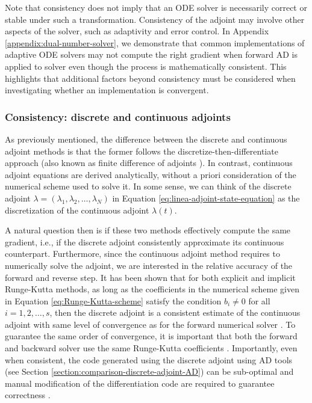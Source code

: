Note that consistency does not imply that an ODE solver is necessarily correct or stable under such a transformation. 
Consistency of the adjoint may involve other aspects of the solver, such as adaptivity and error control. 
In Appendix \ref{appendix:dual-number-solver}, we demonstrate that common implementations of adaptive ODE solvers may not compute the right gradient when forward AD is applied to solver even though the process is mathematically consistent. 
This highlights that additional factors beyond consistency must be considered when investigating whether an implementation is convergent.

\subsubsection{Consistency: discrete and continuous adjoints}

As previously mentioned, the difference between the discrete and continuous adjoint methods is that the former follows the discretize-then-differentiate approach (also known as finite difference of adjoints \cite{Sirkes_Tziperman_1997}).
In contrast, continuous adjoint equations are derived analytically, without a priori consideration of the numerical scheme used to solve it. 
In some sense, we can think of the discrete adjoint $\lambda = (\lambda_1, \lambda_2, \ldots, \lambda_N)$ in Equation \eqref{eq:linea-adjoint-state-equation} as the discretization of the continuous adjoint $\lambda(t)$. 


A natural question then is if these two methods effectively compute the same gradient, i.e., if the discrete adjoint consistently approximate its continuous counterpart. 
Furthermore, since the continuous adjoint method requires to numerically solve the adjoint, we are interested in the relative accuracy of the forward and reverse step. 
It has been shown that for both explicit and implicit Runge-Kutta methods, as long as the coefficients in the numerical scheme given in Equation \eqref{eq:Runge-Kutta-scheme} satisfy the condition $b_i \neq 0$ for all $i=1,2, \ldots, s$, then the discrete adjoint is a consistent estimate of the continuous adjoint with same level of convergence as for the forward numerical solver \cite{Hager_2000,Walther_2007, sandu2006properties, sandu2011solution}.
To guarantee the same order of convergence, it is important that both the forward and backward solver use the same Runge-Kutta coefficients \cite{Alexe_Sandu_2009}.
Importantly, even when consistent, the code generated using the discrete adjoint using AD tools (see Section \ref{section:comparison-discrete-adjoint-AD}) can be sub-optimal and manual modification of the differentiation code are required to guarantee correctness \cite{Eberhard_Bischof_1996, alexe2007denserks}.




